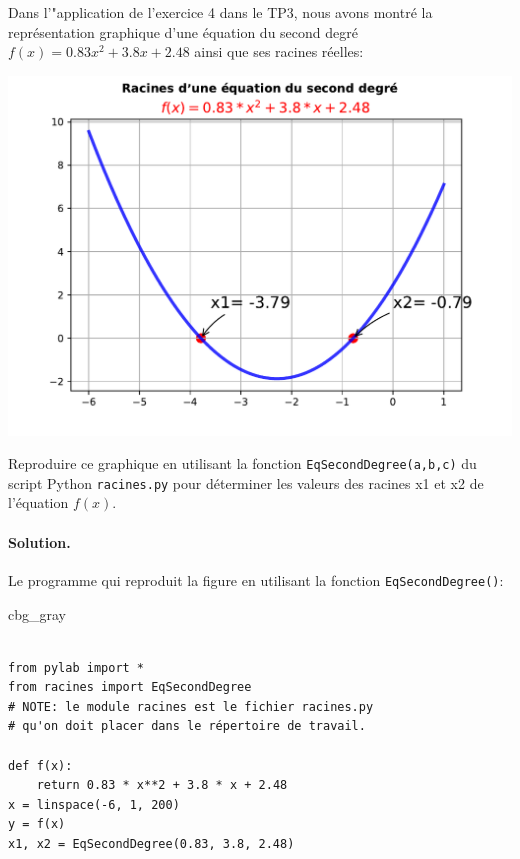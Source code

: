\documentclass[%
oneside,                 %
final,                   %
10pt,french]{article}
\newenvironment{_cod_tight}[1]{
   \def\FrameCommand{\colorbox{#1}}
   \FrameRule0.6pt\MakeFramed {\FrameRestore}\vskip3mm}
   {\vskip0mm\endMakeFramed}
\newenvironment{cod}[1]{
\bgroup\rmfamily
\fboxsep=0mm\relax
\begin{_cod_tight}{#1}
\list{}{\parsep=-2mm\parskip=0mm\topsep=0pt\leftmargin=2mm
\rightmargin=2\leftmargin\leftmargin=4pt\relax}
\item\relax}
{\endlist\end{_cod_tight}\egroup}
\newenvironment{doconceexercise}{}{}
\newcounter{doconceexercisecounter}
\begin{document}
\begin{doconceexercise}



Dans l'"application de l'exercice 4 dans le TP3, nous avons montré la représentation graphique d'une équation du second degré $f(x)=0.83x^2+3.8x+2.48$ ainsi que ses racines réelles:



\vspace{6mm}

\centerline{\includegraphics[width=0.7\linewidth]{figs/equation2deg.pdf}}

\vspace{6mm}


Reproduire ce graphique en utilisant la fonction \texttt{EqSecondDegree(a,b,c)} du script Python \texttt{racines.py} pour déterminer les valeurs des racines x1 et x2 de l’équation $f(x)$.


\paragraph{Solution.}
Le programme qui reproduit la figure en utilisant la fonction \texttt{EqSecondDegree()}:

\begin{cod}{cbg_gray}\begin{verbatim}

from pylab import *
from racines import EqSecondDegree
# NOTE: le module racines est le fichier racines.py
# qu'on doit placer dans le répertoire de travail.

def f(x):
    return 0.83 * x**2 + 3.8 * x + 2.48
x = linspace(-6, 1, 200)
y = f(x)
x1, x2 = EqSecondDegree(0.83, 3.8, 2.48)


\end{verbatim}
\end{cod}
\end{doconceexercise}
\end{document}
